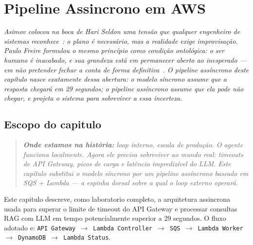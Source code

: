 \chapter{Pipeline Assincrono em AWS}
\label{chap:pipeline_assincrono_aws}

{\small\itshape\color{AccentGray}
Asimov colocou na boca de Hari Seldon uma tens\~{a}o que qualquer engenheiro de sistemas reconhece~\cite{asimov1951foundation}: o plano \'{e} necess\'{a}rio, mas a realidade exige improvisa\c{c}\~{a}o. Paulo Freire formulou o mesmo princ\'{i}pio como condi\c{c}\~{a}o ontol\'{o}gica: o ser humano \'{e} inacabado, e sua grandeza est\'{a} em permanecer aberto ao inesperado --- em n\~{a}o pretender fechar a conta de forma definitiva~\cite{freire1996autonomia}. O pipeline ass\'{i}ncrono deste cap\'{i}tulo nasce exatamente dessa abertura: o modelo s\'{i}ncrono assume que a resposta chegar\'{a} em 29 segundos; o pipeline ass\'{i}ncrono assume que ela pode n\~{a}o chegar, e projeta o sistema para sobreviver a essa incerteza.\par}
\vspace{0.6em}
\section{Escopo do capitulo}

\begin{quote}\itshape
\textbf{Onde estamos na hist\'oria:} loop interno, escala de produ\c{c}\~ao.
O agente funciona localmente. Agora ele precisa sobreviver ao mundo real:
timeouts de API Gateway, picos de carga e lat\^encia imprediz\'ivel do LLM.
Este cap\'itulo substitui o modelo s\'incrono por um pipeline ass\'incrono
baseado em SQS + Lambda --- a espinha dorsal sobre a qual o loop externo operar\'a.
\end{quote}

Este capitulo descreve, como laboratorio completo, a arquitetura
assincrona usada para superar o limite de
timeout do API Gateway e processar consultas RAG com
LLM em tempo potencialmente superior a 29 segundos. O fluxo adotado e:
\texttt{API Gateway $\to$ Lambda Controller $\to$ SQS $\to$ Lambda Worker $\to$ DynamoDB $\to$ Lambda Status}.

